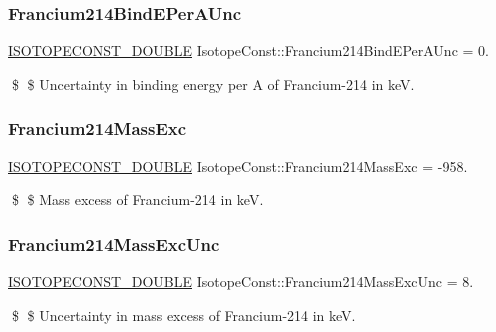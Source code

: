 \subsubsection{\texorpdfstring{Francium214\+Bind\+E\+Per\+A\+Unc}{Francium214BindEPerAUnc}}
{\footnotesize\ttfamily \mbox{\hyperlink{group___isotope_const-_macros_ga8f45a7272ce02c0b4c65c44636ed719a}{I\+S\+O\+T\+O\+P\+E\+C\+O\+N\+S\+T\+\_\+\+D\+O\+U\+B\+LE}} Isotope\+Const\+::\+Francium214\+Bind\+E\+Per\+A\+Unc = 0.}

\$ \$ Uncertainty in binding energy per A of Francium-\/214 in keV. \mbox{\label{group___isotope_const-_francium-_fr214_gacbd57f246bbbaa0d4bccd5fe394a7c77}} 
\subsubsection{\texorpdfstring{Francium214\+Mass\+Exc}{Francium214MassExc}}
{\footnotesize\ttfamily \mbox{\hyperlink{group___isotope_const-_macros_ga8f45a7272ce02c0b4c65c44636ed719a}{I\+S\+O\+T\+O\+P\+E\+C\+O\+N\+S\+T\+\_\+\+D\+O\+U\+B\+LE}} Isotope\+Const\+::\+Francium214\+Mass\+Exc = -\/958.}

\$ \$ Mass excess of Francium-\/214 in keV. \mbox{\label{group___isotope_const-_francium-_fr214_ga283589214aa753b09f25691094655aa1}} 
\subsubsection{\texorpdfstring{Francium214\+Mass\+Exc\+Unc}{Francium214MassExcUnc}}
{\footnotesize\ttfamily \mbox{\hyperlink{group___isotope_const-_macros_ga8f45a7272ce02c0b4c65c44636ed719a}{I\+S\+O\+T\+O\+P\+E\+C\+O\+N\+S\+T\+\_\+\+D\+O\+U\+B\+LE}} Isotope\+Const\+::\+Francium214\+Mass\+Exc\+Unc = 8.}

\$ \$ Uncertainty in mass excess of Francium-\/214 in keV. \mbox{\label{group___isotope_const-_francium-_fr214_ga8b90c4a72de37cf321d0aab228a86c5c}} 
